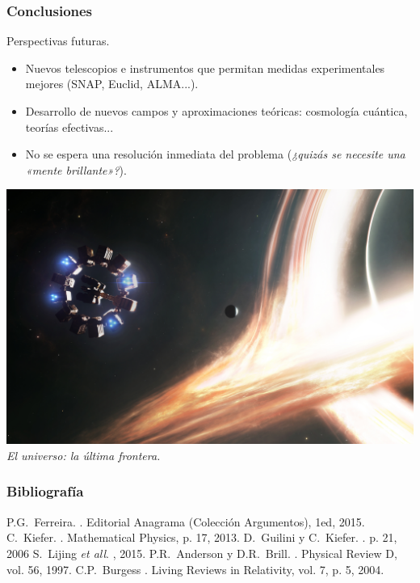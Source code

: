 \documentclass{beamer}
\begin{document}
\begin{frame}
  \frametitle{Conclusiones}
  \begin{exampleblock}{Perspectivas futuras.}
    \begin{itemize}
      \item Nuevos telescopios e instrumentos que permitan medidas experimentales mejores (SNAP, Euclid, ALMA...).
      \item Desarrollo de nuevos campos y aproximaciones teóricas: cosmología cuántica, teorías efectivas...
      \item No se espera una resolución inmediata del problema (\textit{¿quizás se necesite una «mente brillante»?}).
    \end{itemize}
  \end{exampleblock}
  \centering
  \includegraphics[width=.4\textwidth]{interstellar2} \\
  {\em\small El universo: la última frontera.}
\end{frame}


\begin{frame}[allowframebreaks]
  \frametitle<presentation>{Bibliografía}
  \begin{thebibliography}{10}
  \beamertemplatebookbibitems
    P.G.~Ferreira.
    .
    \newblock Editorial Anagrama (Colección Argumentos), 1ed, 2015.
  \beamertemplatearticlebibitems
    C.~Kiefer.
    .
    \newblock Mathematical Physics, p. 17, 2013.
    D.~Guilini y C.~Kiefer.
    .
    \newblock p. 21, 2006
    S.~Lijing {\em et all}.
    , 2015.
    P.R.~Anderson y D.R.~Brill.
    .
    \newblock Physical Review D, vol. 56, 1997.
    C.P.~Burgess
    .
    \newblock Living Reviews in Relativity, vol. 7, p. 5, 2004.
  \end{thebibliography}
\end{frame}
\end{document}
